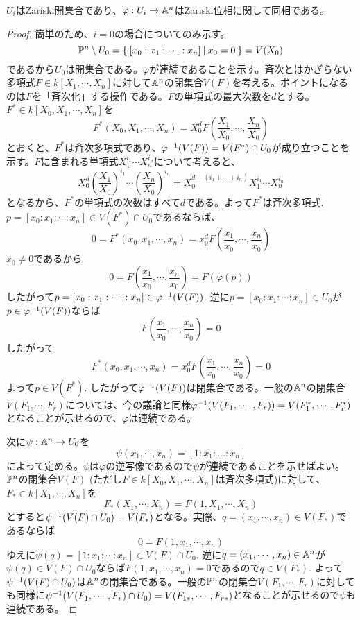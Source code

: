 \documentclass{ltjsreport}
\begin{document}
\begin{prop}
  $U_i$はZariski開集合であり、$\varphi:U_i\rightarrow \mathbb{A}^n$はZariski位相に関して同相である。
\end{prop}

\begin{proof}
  簡単のため、$i=0$の場合についてのみ示す。
  \[
  \mathbb{P}^n\setminus U_0=\left\{\:[x_0:x_1:\cdots:x_n]\:\middle|\:x_0=0\:\right\}=V(X_0) 
  \]
  であるから$U_0$は開集合である。$\varphi$が連続であることを示す。斉次とはかぎらない多項式$F\in k[X_1,\cdots,X_n]$に対して$\mathbb{A}^n$の閉集合$V(F)$を考える。ポイントになるのは$F$を「斉次化」する操作である。$F$の単項式の最大次数を$d$とする。
  $F^*\in k[X_0,X_1,\cdots,X_n]$を
  \[
  F^*(X_0,X_1,\cdots,X_n)=X_0^dF(\frac{X_1}{X_0},\cdots,\frac{X_n}{X_0})
  \]
  とおくと、$F^*$は斉次多項式であり、$\varphi^{-1}(V(F))=V(F^*)\cap U_0$が成り立つことを示す。$F$に含まれる単項式$X_1^{i_1}\cdots X_n^{i_n}$について考えると、
  \[
  X_0^d(\frac{X_1}{X_0})^{i_1}\cdots(\frac{X_n}{X_0})^{i_n}=X_0^{d-(i_1+\cdots+i_n)}X_1^{i_1}\cdots X_n^{i_n} 
  \]
  となるから、$F^*$の単項式の次数はすべて$d$である。よって$F^*$は斉次多項式. $p=[x_0:x_1:\cdots:x_n]\in V(F^*)\cap U_0$であるならば、
  \[
  0=F^*(x_0,x_1,\cdots,x_n)=x_0^dF(\frac{x_1}{x_0},\cdots,\frac{x_n}{x_0})
  \]
  $x_0\neq 0$であるから
  \[
  0=F(\frac{x_1}{x_0},\cdots,\frac{x_n}{x_0})=F(\varphi(p)) 
  \]
  したがって$p=[x_0:x_1:\cdots:x_n]\in \varphi^{-1}(V(F))$. 逆に$p=[x_0:x_1:\cdots:x_n]\in U_0$が$p\in\varphi^{-1}(V(F))$ならば
  \[
  F(\frac{x_1}{x_0},\cdots,\frac{x_n}{x_0})=0
  \]
  したがって
  \[
  F^*(x_0,x_1,\cdots,x_n)=x_0^dF(\frac{x_1}{x_0},\cdots,\frac{x_n}{x_0})=0
  \]
  よって$p\in V(F^*)$. したがって$\varphi^{-1}(V(F))$は閉集合である。一般の$\mathbb{A}^n$の閉集合$V(F_1,\cdots,F_r)$については、今の議論と同様$\varphi^{-1}(V(F_1,\cdots,F_r))=V(F_1^*,\cdots,F_r^*)$となることが示せるので、$\varphi$は連続である。

  次に$\psi:\mathbb{A}^n\rightarrow U_0$を
  \[
  \psi(x_1,\cdots,x_n)=[1:x_1:\dots:x_n]  
  \]
  によって定める。$\psi$は$\varphi$の逆写像であるので$\psi$が連続であることを示せばよい。$\mathbb{P}^n$の閉集合$V(F)$ (ただし$F\in k[X_0,X_1,\cdots,X_n]$は斉次多項式)に対して、$F_*\in k[X_1,\cdots,X_n]$を
  \[
  F_*(X_1,\cdots,X_n)=F(1,X_1,\cdots,X_n)  
  \]
  とすると$\psi^{-1}(V(F)\cap U_0)=V(F_*)$となる。実際、$q=(x_1,\cdots,x_n)\in V(F_*)$であるならば
  \[
  0=F(1,x_1,\cdots,x_n)  
  \]
  ゆえに$\psi(q)=[1:x_1:\cdots:x_n]\in V(F)\cap U_0$. 逆に$q=(x_1,\cdots,x_n)\in\mathbb{A}^n$が$\psi(q)\in V(F)\cap U_0$ならば$F(1,x_1,\cdots,x_n)=0$であるので$q\in V(F_*)$. よって$\psi^{-1}(V(F)\cap U_0)$は$\mathbb{A}^n$の閉集合である。一般の$\mathbb{P}^n$の閉集合$V(F_1,\cdots,F_r)$に対しても同様に$\psi^{-1}(V(F_1,\cdots,F_r)\cap U_0)=V(F_{1*},\cdots,F_{r*})$となることが示せるので$\psi$も連続である。
\end{proof}
\end{document}
